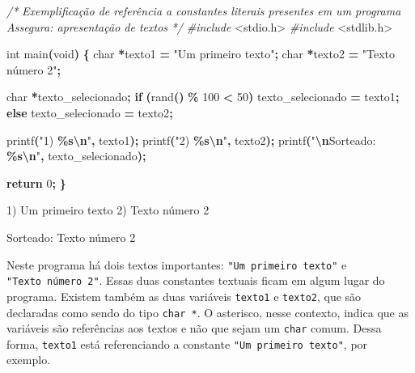 \documentclass[
  11pt,
  a4paper,
]{scrbook}
\newenvironment{Shaded}{\begin{snugshade}}{\end{snugshade}}
\newcommand{\CommentTok}[1]{\textcolor[rgb]{0.56,0.35,0.01}{\textit{#1}}}
\newcommand{\ControlFlowTok}[1]{\textcolor[rgb]{0.13,0.29,0.53}{\textbf{#1}}}
\newcommand{\DataTypeTok}[1]{\textcolor[rgb]{0.13,0.29,0.53}{#1}}
\newcommand{\DecValTok}[1]{\textcolor[rgb]{0.00,0.00,0.81}{#1}}
\newcommand{\ImportTok}[1]{#1}
\newcommand{\NormalTok}[1]{#1}
\newcommand{\OperatorTok}[1]{\textcolor[rgb]{0.81,0.36,0.00}{\textbf{#1}}}
\newcommand{\PreprocessorTok}[1]{\textcolor[rgb]{0.56,0.35,0.01}{\textit{#1}}}
\newcommand{\SpecialCharTok}[1]{\textcolor[rgb]{0.81,0.36,0.00}{\textbf{#1}}}
\newcommand{\StringTok}[1]{\textcolor[rgb]{0.31,0.60,0.02}{#1}}
\begin{document}
\begin{Shaded}
\begin{Highlighting}[]
\CommentTok{/*}
\CommentTok{Exemplificação de referência a constantes literais presentes em um programa}
\CommentTok{Assegura: apresentação de textos}
\CommentTok{*/}
\PreprocessorTok{\#include }\ImportTok{\textless{}stdio.h\textgreater{}}
\PreprocessorTok{\#include }\ImportTok{\textless{}stdlib.h\textgreater{}}

\DataTypeTok{int}\NormalTok{ main}\OperatorTok{(}\DataTypeTok{void}\OperatorTok{)} \OperatorTok{\{}
    \DataTypeTok{char} \OperatorTok{*}\NormalTok{texto1 }\OperatorTok{=} \StringTok{"Um primeiro texto"}\OperatorTok{;}
    \DataTypeTok{char} \OperatorTok{*}\NormalTok{texto2 }\OperatorTok{=} \StringTok{"Texto número 2"}\OperatorTok{;}

    \DataTypeTok{char} \OperatorTok{*}\NormalTok{texto\_selecionado}\OperatorTok{;}
    \ControlFlowTok{if} \OperatorTok{(}\NormalTok{rand}\OperatorTok{()} \OperatorTok{\%} \DecValTok{100} \OperatorTok{\textless{}} \DecValTok{50}\OperatorTok{)}
\NormalTok{        texto\_selecionado }\OperatorTok{=}\NormalTok{ texto1}\OperatorTok{;}
    \ControlFlowTok{else}
\NormalTok{        texto\_selecionado }\OperatorTok{=}\NormalTok{ texto2}\OperatorTok{;}

\NormalTok{    printf}\OperatorTok{(}\StringTok{"1) }\SpecialCharTok{\%s\textbackslash{}n}\StringTok{"}\OperatorTok{,}\NormalTok{ texto1}\OperatorTok{);}
\NormalTok{    printf}\OperatorTok{(}\StringTok{"2) }\SpecialCharTok{\%s\textbackslash{}n}\StringTok{"}\OperatorTok{,}\NormalTok{ texto2}\OperatorTok{);}
\NormalTok{    printf}\OperatorTok{(}\StringTok{"}\SpecialCharTok{\textbackslash{}n}\StringTok{Sorteado: }\SpecialCharTok{\%s\textbackslash{}n}\StringTok{"}\OperatorTok{,}\NormalTok{ texto\_selecionado}\OperatorTok{);}

    \ControlFlowTok{return} \DecValTok{0}\OperatorTok{;}
\OperatorTok{\}}
\end{Highlighting}
\end{Shaded}

\begin{Shaded}
\begin{Highlighting}[]
\NormalTok{1) Um primeiro texto}
\NormalTok{2) Texto número 2}

\NormalTok{Sorteado: Texto número 2}
\end{Highlighting}
\end{Shaded}

Neste programa há dois textos importantes:
\texttt{"Um\ primeiro\ texto"} e \texttt{"Texto\ número\ 2"}. Essas duas
constantes textuais ficam em algum lugar do programa. Existem também as
duas variáveis \texttt{texto1} e \texttt{texto2}, que são declaradas
como sendo do tipo \texttt{char\ *}. O asterisco, nesse contexto, indica
que as variáveis são referências aos textos e não que sejam um
\texttt{char} comum. Dessa forma, \texttt{texto1} está referenciando a
constante \texttt{"Um\ primeiro\ texto"}, por exemplo.
\end{document}
